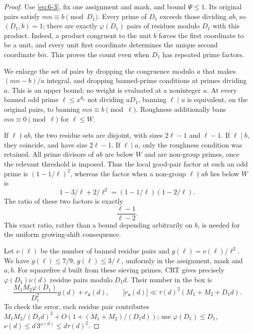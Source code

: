 \documentclass[11pt]{article}
\theoremstyle{definition}
\theoremstyle{definition}
\begin{document}
\begin{proof}
Use \eqref{eq:6-3}, fix one assignment and mask, and bound \(\Psi\le1\). Its original pairs satisfy \(mn\equiv b\pmod{D_1}\). Every prime of \(D_1\) exceeds those dividing \(ab\), so \((D_1,b)=1\); there are exactly \(\varphi(D_1)\) pairs of residues modulo \(D_1\) with this product. Indeed, a product congruent to the unit \(b\) forces the first coordinate to be a unit, and every unit first coordinate determines the unique second coordinate \(b\overline m\). This proves the count even when \(D_1\) has repeated prime factors.

We enlarge the set of pairs by dropping the congruence modulo \(a\) that makes \((mn-b)/a\) integral, and dropping banned-prime conditions at primes dividing \(a\). This is an upper bound; no weight is evaluated at a noninteger \(u\). At every banned odd prime \(\ell\le x^{\theta_0}\) not dividing \(aD_1\), banning \(\ell\mid u\) is equivalent, on the original pairs, to banning \(mn\equiv b\pmod\ell\). Roughness additionally bans \(mn\equiv0\pmod\ell\) for \(\ell\le W\).

If \(\ell\nmid ab\), the two residue sets are disjoint, with sizes \(2\ell-1\) and \(\ell-1\). If \(\ell\mid b\), they coincide, and have size \(2\ell-1\). If \(\ell\mid a\), only the roughness condition was retained. All prime divisors of \(ab\) are below \(W\) and are non-group primes, once the relevant threshold is imposed. Thus the local good-pair factor at such an odd prime is \((1-1/\ell)^2\), whereas the factor when a non-group \(\ell\nmid ab\) lies below \(W\) is
\begin{equation*}
1-3/\ell+2/\ell^2=(1-1/\ell)(1-2/\ell).
\end{equation*}
The ratio of these two factors is exactly
\begin{equation}
\frac{\ell-1}{\ell-2}.                                \tag{6.5}\label{eq:6-5}
\end{equation}
This exact ratio, rather than a bound depending arbitrarily on \(b\), is needed for the uniform growing-shift consequence.

Let \(\nu(\ell)\) be the number of banned residue pairs and \(g(\ell)=\nu(\ell)/\ell^2\). We have \(g(\ell)\le7/9\), \(g(\ell)\le3/\ell\), uniformly in the assignment, mask and \(a,b\). For squarefree \(d\) built from these sieving primes, CRT gives precisely \(\varphi(D_1)\nu(d)\) residue pairs modulo \(D_1d\). Their number in the box is
\begin{equation}
\frac{M_1M_2\varphi(D_1)}{D_1^2}g(d)+r_{\mathfrak a}(d),
 \qquad
 |r_{\mathfrak a}(d)|\ll\tau(d)^2(M_1+M_2+D_1d).         \tag{6.6}\label{eq:6-6}
\end{equation}
To check the error, each residue pair contributes
\(M_1M_2/(D_1d)^2+O(1+(M_1+M_2)/(D_1d))\);
use \(\varphi(D_1)\le D_1\), \(\nu(d)\le d\,3^{\omega(d)}\le d\tau(d)^2\).


\end{proof}
\end{document}
